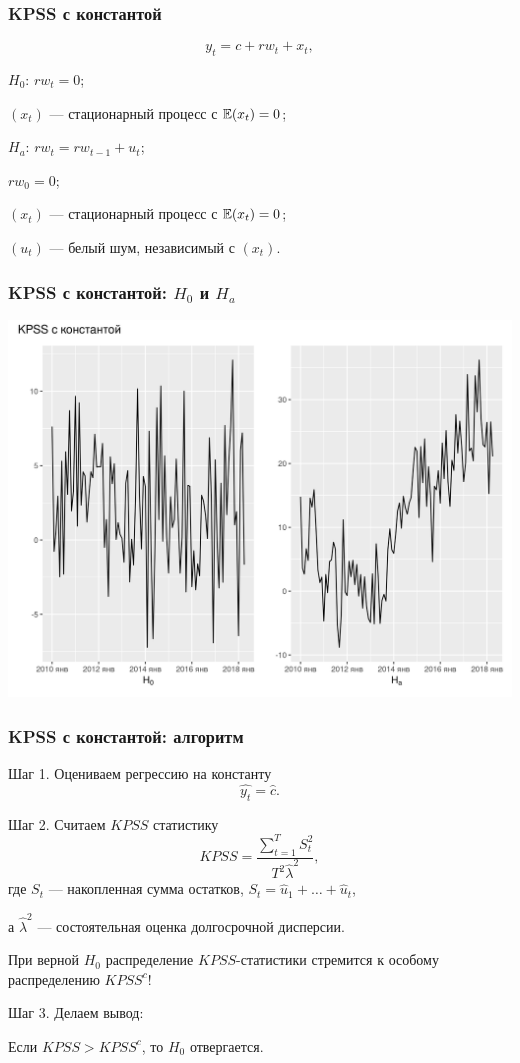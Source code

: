   
  \begin{frame}
    \frametitle{KPSS с константой}
    \[
      y_t = c + rw_t + x_t,
    \]
  
    \pause
  
    \alert{$H_0$: $rw_t = 0$};
    
    $(x_t)$ — стационарный процесс с $\mathbb{E}(x_t) = 0$;
    
    \pause
  
    \alert{$H_a$: $rw_t = rw_{t-1} + u_t$};

    $rw_0 = 0$;
  
    $(x_t)$ — стационарный процесс с $\mathbb{E}(x_t) = 0$;

    $(u_t)$ — белый шум, независимый с $(x_t)$.
  
  \end{frame}
  
  \begin{frame}
    \frametitle{KPSS с константой: $H_0$ и $H_a$}
    \includegraphics[width=\textwidth]{pictures/om_ts_06-077.png}
  
  \end{frame}
  
  \begin{frame}
    \frametitle{KPSS с константой: алгоритм}
  
    Шаг 1. Оцениваем \alert{регрессию на константу} 
    \[
      \widehat{y_t} = \hat c.  
    \]
  
    \pause
    Шаг 2. Считаем $KPSS$ статистику
    \[
    KPSS = \frac{\sum_{t=1}^T S_t^2}{T^2 \hat \lambda^2},
    \]
    где $S_t$ — накопленная сумма остатков, $S_t = \hat u_1 + \ldots + \hat u_t$,

    а $\hat\lambda^2$ — состоятельная оценка долгосрочной дисперсии. 
  
    \pause
    При верной $H_0$ распределение $KPSS$-статистики стремится к \alert{особому распределению} $KPSS^c$!
  
    \pause 
    Шаг 3. Делаем вывод:
    
    Если $KPSS > KPSS^c$, то $H_0$ отвергается. 
  
  \end{frame}
  
